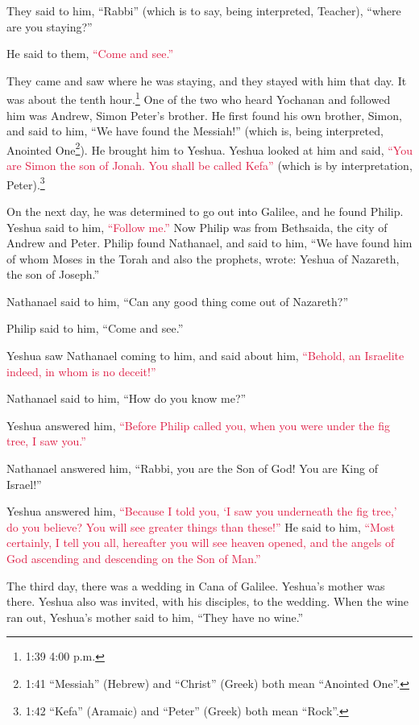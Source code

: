 They said to him, “Rabbi” (which is to say, being interpreted, Teacher), “where are you staying?”

\myverse{}He said to them,
\textcolor{crimson}{“Come and see.”}

They came and saw where he was staying, and they stayed with him that day. It was about the
tenth hour.\footnote{1:39 4:00 p.m.}
\myverse{}One of the two who heard Yochanan and followed him was Andrew, Simon Peter’s
brother.
\myverse{}He first found his own brother, Simon, and said to him, “We have found the
Messiah!” (which is, being interpreted, Anointed One\footnote{1:41 “Messiah” (Hebrew) and “Christ” (Greek) both mean “Anointed One”.}).
\myverse{}He brought him to Yeshua. Yeshua looked at him and said,
\textcolor{crimson}{“You are Simon the son of Jonah. You shall be called Kefa”} (which is by interpretation, Peter).\footnote{1:42 “Kefa” (Aramaic) and “Peter” (Greek) both mean “Rock”.}

\myverse{}On the next day, he was determined to go out into Galilee, and
he found Philip. Yeshua said to him,
\textcolor{crimson}{“Follow me.”}
\myverse{}Now Philip was from Bethsaida, the city of Andrew and Peter.
\myverse{}Philip found Nathanael, and said to him, “We have found him of whom Moses in the Torah
and also the prophets, wrote: Yeshua of Nazareth, the son of Joseph.”

\myverse{}Nathanael said to him, “Can any good thing come out of Nazareth?”

Philip said to him, “Come and see.”

\myverse{}Yeshua saw Nathanael coming to him, and said about him,
\textcolor{crimson}{“Behold, an Israelite indeed, in whom is no deceit!”}

\myverse{}Nathanael said to him, “How do you know me?”

Yeshua answered him,
\textcolor{crimson}{“Before Philip called you, when you were under the fig tree, I saw you.”}

\myverse{}Nathanael answered him, “Rabbi, you are the Son of God! You are
King of Israel!”

\myverse{}Yeshua answered him,
\textcolor{crimson}{“Because I told you, ‘I saw you underneath the fig tree,’ do you believe? You will see greater things
	than these!”}
\myverse{}He said to him,
\textcolor{crimson}{“Most certainly, I tell you all, hereafter you will see heaven opened, and the angels of God ascending
	and descending on the Son of Man.”}


\mychapter{} \myverse*{}The third day, there was a wedding in Cana of Galilee. Yeshua’s
mother was there.
\myverse{}Yeshua also was invited, with his disciples, to the wedding.
\myverse{}When the wine ran out, Yeshua’s mother said to him, “They have no wine.”

